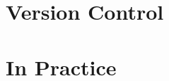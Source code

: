 \documentclass{beamer}
\begin{document}
\section{Version Control}


\section{In Practice}

\end{document}
